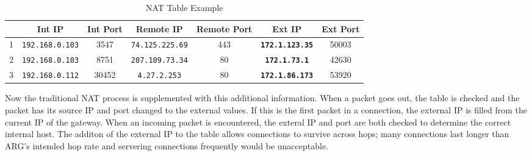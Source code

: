 \begin{table}
\caption{NAT Table Example}
\label{tab:arg_nat_example}
\centering
\begin{tabular}{r|cccccc}
  & Int IP & Int Port & Remote IP & Remote Port & \textbf{Ext IP} & Ext Port\\
\hline
1 & \texttt{192.168.0.103} & 3547 & \texttt{74.125.225.69} & 443 & \textbf{\texttt{172.1.123.35}} & 50003\\
2 & \texttt{192.168.0.103} & 8751 & \texttt{207.109.73.34} & 80 & \textbf{\texttt{172.1.73.1}} & 42630\\
3 & \texttt{192.168.0.112} & 30452 & \texttt{4.27.2.253} & 80 & \textbf{\texttt{172.1.86.173}} & 53920
\end{tabular}
\end{table}

\par Now the traditional \ac{NAT} process is supplemented with this additional information. When a packet goes out, the table is checked and the packet has its source IP and port changed to the external values. If this is the first packet in a connection, the external IP is filled from the current IP of the gateway. When an incoming packet is encountered, the exteral IP and port are both checked to determine the correct internal host. The additon of the external IP to the table allows connections to survive across hops; many connections last longer than \ac{ARG}'s intended hop rate and servering connections frequently would be unacceptable. 

